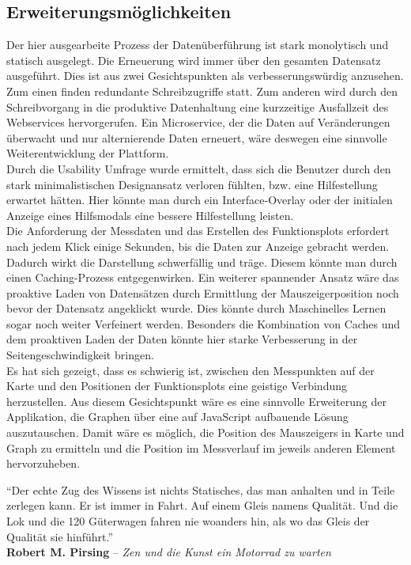 \subsection{Erweiterungsmöglichkeiten}

Der hier ausgearbeite Prozess der Datenüberführung ist stark monolytisch und statisch ausgelegt. Die Erneuerung wird immer über den gesamten Datensatz ausgeführt.
Dies ist aus zwei Gesichtspunkten als verbesserungswürdig anzusehen. Zum einen finden redundante Schreibzugriffe statt. Zum anderen wird durch den Schreibvorgang in die produktive Datenhaltung eine kurzzeitige Ausfallzeit des Webservices hervorgerufen.
Ein Microservice, der die Daten auf Veränderungen überwacht und nur alternierende Daten erneuert, wäre deswegen eine sinnvolle Weiterentwicklung der Plattform.
\\

Durch die Usability Umfrage wurde ermittelt, dass sich die Benutzer durch den stark minimalistischen Designansatz verloren fühlten, bzw. eine Hilfestellung erwartet hätten. Hier könnte man durch ein Interface-Overlay oder der initialen Anzeige eines Hilfsmodals eine bessere Hilfestellung leisten.
\\

Die Anforderung der Messdaten und das Erstellen des Funktionsplots erfordert nach jedem Klick einige Sekunden, bis die Daten zur Anzeige gebracht werden. Dadurch wirkt die Darstellung schwerfällig und träge. Diesem könnte man durch einen Caching-Prozess entgegenwirken. Ein weiterer spannender Ansatz wäre das proaktive Laden von Datensätzen durch Ermittlung der Mauszeigerposition noch bevor der Datensatz angeklickt wurde. Dies könnte durch Maschinelles Lernen sogar noch weiter Verfeinert werden. Besonders die Kombination von Caches und dem proaktiven Laden der Daten könnte hier starke Verbesserung in der Seitengeschwindigkeit bringen.
\\

Es hat sich gezeigt, dass es schwierig ist, zwischen den Messpunkten auf der Karte und den Positionen der Funktionsplots eine geistige Verbindung herzustellen. Aus diesem Gesichtspunkt wäre es eine sinnvolle Erweiterung der Applikation, die Graphen über eine auf JavaScript aufbauende Lösung auszutauschen. Damit wäre es möglich, die Position des Mauszeigers in Karte und Graph zu ermitteln und die Position im Messverlauf im jeweils anderen Element hervorzuheben.


\newpage


\vspace*{\fill}\thispagestyle{plain}
"`Der echte Zug des Wissens ist nichts Statisches, das man anhalten und in Teile zerlegen kann. Er ist immer in Fahrt. Auf einem Gleis namens Qualität. Und die Lok und die 120 Güterwagen fahren nie woanders hin, als wo das Gleis der Qualität sie hinführt."'
\\
\hrulefill \vspace{0.3cm}
\hfill\textbf{Robert M. Pirsing} -- \textit{Zen und die Kunst ein Motorrad zu warten}
\vspace*{\fill}
